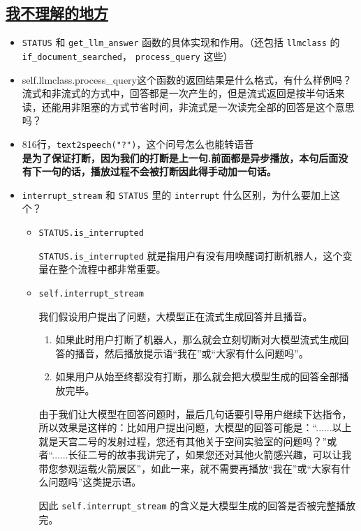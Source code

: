 \documentclass[]{article}
\begin{document}
	\subsection{\underline{我不理解的地方}}
\begin{itemize}
	\item \texttt{STATUS} 和 \texttt{get\_llm\_answer} 函数的具体实现和作用。（还包括 \texttt{llmclass} 的 \texttt{if\_document\_searched}， \texttt{process\_query} 这些）
	\item \textcolor{mycolor}{self.llmclass.process\_query这个函数的返回结果是什么格式，有什么样例吗？流式和非流式的方式中，回答都是一次产生的，但是流式返回是按半句话来读，还能用非阻塞的方式节省时间，非流式是一次读完全部的回答是这个意思吗？}
	\item 816行，\texttt{text2speech("?")}，这个问号怎么也能转语音\\
	\textbf{是为了保证打断，因为我们的打断是上一句.前面都是异步播放，本句后面没有下一句的话，播放过程不会被打断因此得手动加一句话。}
	\item \texttt{interrupt\_stream} 和 \texttt{STATUS} 里的 \texttt{interrupt} 什么区别，为什么要加上这个？
	\begin{itemize}
		\item \texttt{STATUS.is\_interrupted}
		
		\texttt{STATUS.is\_interrupted} 就是指用户有没有用唤醒词打断机器人，这个变量在整个流程中都非常重要。
		
		\item \texttt{self.interrupt\_stream}
		
		我们假设用户提出了问题，大模型正在流式生成回答并且播音。
		
		\begin{enumerate}
			\item 如果此时用户打断了机器人，那么就会立刻切断对大模型流式生成回答的播音，然后播放提示语“我在”或“大家有什么问题吗”。
			\item 如果用户从始至终都没有打断，那么就会把大模型生成的回答全部播放完毕。
		\end{enumerate}
		
		由于我们让大模型在回答问题时，最后几句话要引导用户继续下达指令，所以效果是这样的：比如用户提出问题，大模型的回答可能是：“......以上就是天宫二号的发射过程，您还有其他关于空间实验室的问题吗？”或者“......长征二号的故事我讲完了，如果您还对其他火箭感兴趣，可以让我带您参观运载火箭展区”，如此一来，就不需要再播放“我在”或“大家有什么问题吗”这类提示语。
		
		因此 \texttt{self.interrupt\_stream} 的含义是大模型生成的回答是否被完整播放完。
		

\end{itemize}
\end{itemize}
\end{document}
